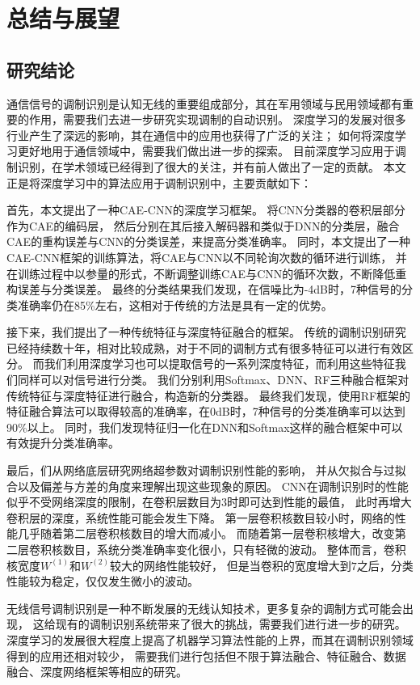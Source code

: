 \chapter{总结与展望}
\section{研究结论}
通信信号的调制识别是认知无线的重要组成部分，其在军用领域与民用领域都有重要的作用，需要我们去进一步研究实现调制的自动识别。
深度学习的发展对很多行业产生了深远的影响，其在通信中的应用也获得了广泛的关注；
如何将深度学习更好地用于通信领域中，需要我们做出进一步的探索。
目前深度学习应用于调制识别，在学术领域已经得到了很大的关注，并有前人做出了一定的贡献。
本文正是将深度学习中的算法应用于调制识别中，主要贡献如下：

首先，本文提出了一种CAE-CNN的深度学习框架。
将CNN分类器的卷积层部分作为CAE的编码层，
然后分别在其后接入解码器和类似于DNN的分类层，融合CAE的重构误差与CNN的分类误差，来提高分类准确率。
同时，本文提出了一种CAE-CNN框架的训练算法，将CAE与CNN以不同轮询次数的循环进行训练，
并在训练过程中以参量的形式，不断调整训练CAE与CNN的循环次数，不断降低重构误差与分类误差。
最终的分类结果我们发现，在信噪比为-4dB时，7种信号的分类准确率仍在85\%左右，这相对于传统的方法是具有一定的优势。\par

接下来，我们提出了一种传统特征与深度特征融合的框架。
传统的调制识别研究已经持续数十年，相对比较成熟，对于不同的调制方式有很多特征可以进行有效区分。
而我们利用深度学习也可以提取信号的一系列深度特征，而利用这些特征我们同样可以对信号进行分类。
我们分别利用Softmax、DNN、RF三种融合框架对传统特征与深度特征进行融合，构造新的分类器。
最终我们发现，使用RF框架的特征融合算法可以取得较高的准确率，在0dB时，7种信号的分类准确率可以达到90\%以上。
同时，我们发现特征归一化在DNN和Softmax这样的融合框架中可以有效提升分类准确率。\par

最后，们从网络底层研究网络超参数对调制识别性能的影响，
并从欠拟合与过拟合以及偏差与方差的角度来理解出现这些现象的原因。
CNN在调制识别时的性能似乎不受网络深度的限制，在卷积层数目为$3$时即可达到性能的最值，
此时再增大卷积层的深度，系统性能可能会发生下降。
第一层卷积核数目较小时，网络的性能几乎随着第二层卷积核数目的增大而减小。
而随着第一层卷积核增大，改变第二层卷积核数目，系统分类准确率变化很小，只有轻微的波动。
整体而言，卷积核宽度$W^{(1)}$和$W^{(2)}$较大的网络性能较好，
但是当卷积的宽度增大到$7$之后，分类性能较为稳定，仅仅发生微小的波动。\par

无线信号调制识别是一种不断发展的无线认知技术，更多复杂的调制方式可能会出现，
这给现有的调制识别系统带来了很大的挑战，需要我们进行进一步的研究。
深度学习的发展很大程度上提高了机器学习算法性能的上界，而其在调制识别领域得到的应用还相对较少，
需要我们进行包括但不限于算法融合、特征融合、数据融合、深度网络框架等相应的研究。\par

